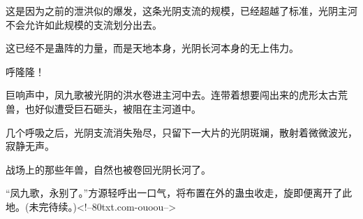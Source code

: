 \begin{this_body}
这是因为之前的泄洪似的爆发，这条光阴支流的规模，已经超越了标准，光阴主河不会允许如此规模的支流划分出去。

这已经不是蛊阵的力量，而是天地本身，光阴长河本身的无上伟力。

呼隆隆！

巨响声中，凤九歌被光阴的洪水卷进主河中去。连带着想要闯出来的虎形太古荒兽，也好似遭受巨石砸头，被阻在主河道中。

几个呼吸之后，光阴支流消失殆尽，只留下一大片的光阴斑斓，散射着微微波光，寂静无声。

战场上的那些年兽，自然也被卷回光阴长河了。

“凤九歌，永别了。”方源轻呼出一口气，将布置在外的蛊虫收走，旋即便离开了此地。(未完待续。)<!--80txt.com-ouoou-->

\end{this_body}

